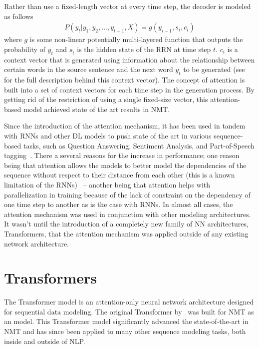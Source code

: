 Rather than use a fixed-length vector at every time step, the decoder is modeled as follows 
\begin{align*}
P(y_t \vert y_1, y_2, ..., y_{t-1}, X) = g(y_{i-1}, s_i, c_i)    
\end{align*}
where $g$ is some non-linear potentially multi-layered function that outputs the probability of $y_{t}$ and $s_{\hat{t}}$ is the hidden state of the RRN at time step $t$. $c_i$ is a context vector that is generated using information about the relationship between certain words in the source sentence and the next word $y_t$ to be generated (see~\citet{bahdanau2014neural} for the full description behind this context vector). The concept of attention is built into a set of context vectors for each time step in the generation process. By getting rid of the restriction of using a single fixed-size vector, this attention-based model achieved state of the art results in NMT. 

Since the introduction of the attention mechanism, it has been used in tandem with RNNs and other DL models to push state of the art in various sequence-based tasks, such as Question Answering, Sentiment Analysis, and Part-of-Speech tagging~\cite{chaudhari2019attentive}. There a several reasons for the increase in performance; one reason being that attention allows the models to better model the dependencies of the sequence without respect to their distance from each other (this is a known limitation of the RNNs)~\cite{vaswani2017attention} -- another being that attention helps with parallelization in training because of the lack of constraint on the dependency of one time step to another as is the case with RNNs. In almost all cases, the attention mechanism was used in conjunction with other modeling architectures. It wasn't until the introduction of a completely new family of NN architectures, Transformers, that the attention mechanism was applied outside of any existing network architecture.


\section{Transformers}
The Transformer model is an attention-only neural network architecture designed for sequential data modeling. The original Transformer by~\citet{vaswani2017attention} was built for NMT as an \ed{} model. This Transformer model significantly advanced the state-of-the-art in NMT and has since been applied to many other sequence modeling tasks, both inside and outside of NLP. 
\newcommand{\mb}[1]{\mathbf{#1}}

